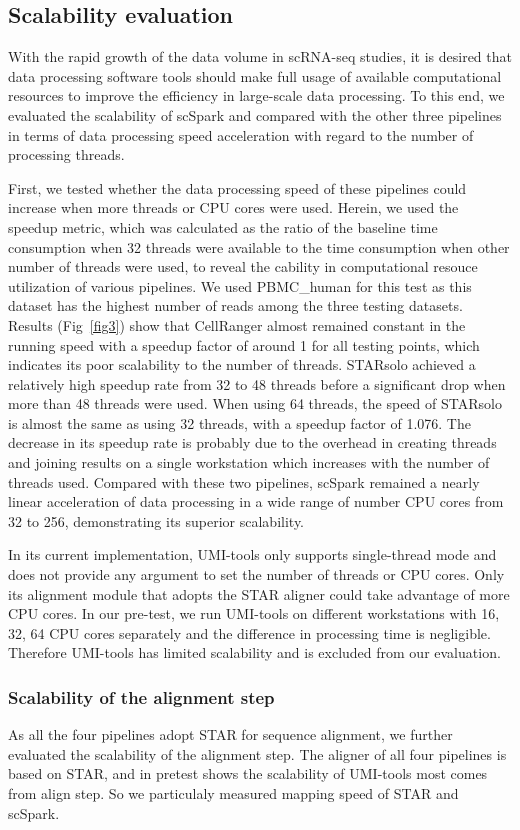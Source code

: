 \documentclass[conference]{IEEEtran}
\begin{document}
\subsection{Scalability evaluation}
With the rapid growth of the data volume in scRNA-seq studies, it is desired that data processing software tools should make full usage of available computational resources to improve the efficiency in large-scale data processing. To this end, we evaluated the scalability of scSpark and compared with the other three pipelines in terms of data processing speed acceleration with regard to the number of processing threads.

First, we tested whether the data processing speed of these pipelines could increase when more threads or CPU cores were used. Herein, we used the speedup metric, which was calculated as the ratio of the baseline time consumption when 32 threads were available to the time consumption when other number of threads were used, to reveal the cability in computational resouce utilization of various pipelines. 
We used PBMC\_human for this test as this dataset has the highest number of reads among the three testing datasets. 
Results (Fig~\ref{fig3}) show that CellRanger almost remained constant in the running speed with a speedup factor of around 1 for all testing points, which indicates its poor scalability to the number of threads. 
STARsolo achieved a relatively high speedup rate from 32 to 48 threads before a significant drop when more than 48 threads were used. When using 64 threads, the speed of STARsolo is almost the same as using 32 threads, with a speedup factor of 1.076. 
The decrease in its speedup rate is probably due to the overhead in creating threads and joining results on a single workstation which increases with the number of threads used. 
Compared with these two pipelines, scSpark remained a nearly linear acceleration of data processing in a wide range of number CPU cores from 32 to 256, demonstrating its superior scalability. 

In its current implementation, UMI-tools only supports single-thread mode and does not provide any argument to set the number of threads or CPU cores. Only its alignment module that adopts the STAR aligner could take advantage of more CPU cores. 
In our pre-test, we run UMI-tools on different workstations with 16, 32, 64 CPU cores separately and the difference in processing time is negligible. 
Therefore UMI-tools has limited scalability and is excluded from our evaluation. 

\subsubsection{Scalability of the alignment step}
As all the four pipelines adopt STAR for sequence alignment, we further evaluated the scalability of the alignment step.  
The aligner of all four pipelines is based on STAR, and in pretest shows the scalability of UMI-tools most comes from align step.
So we particulaly measured mapping speed of STAR and scSpark.
\end{document}
